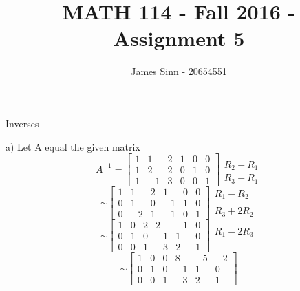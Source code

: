 \documentclass[12pt]{article}
\newcommand{\sqbrl}{\left[}
\newcommand{\sqbrr}{\right]}
\newenvironment{problem}[2][Problem]{\begin{trivlist}
\item[\hskip \labelsep {\bfseries #1}\hskip \labelsep {\bfseries #2.}]}{\end{trivlist}}
\begin{document}
 
 
\title{MATH 114 - Fall 2016 - Assignment 5}
\author{James Sinn - 20654551}
\maketitle

\begin{problem}{1}
	Inverses
\end{problem}
a) Let A equal the given matrix\\
\[A^{-1} = \sqbrl\begin{array}{ccc|ccc}
1 & 1 & 2 & 1 & 0 & 0\\
1 & 2 & 2 & 0 & 1 & 0 \\
1 & -1 & 3 & 0 & 0 & 1
\end{array}\sqbrr\begin{matrix}\\R_2 - R_1\\R_3 - R_1\end{matrix}\]
\[\sim \sqbrl\begin{array}{ccc|ccc}
1 & 1 & 2 & 1 & 0 & 0\\
0 & 1 & 0 & -1 & 1 & 0\\
0 & -2 & 1 & -1 & 0 & 1
\end{array}\sqbrr\begin{matrix}R_1 - R_2\\\\R_3 + 2R_2\end{matrix}\]
\[\sim \sqbrl\begin{array}{ccc|ccc}
1 & 0 & 2 & 2 & -1 & 0\\
0 & 1 & 0 & -1 & 1 & 0\\
0 & 0 & 1 & -3 & 2 & 1
\end{array}\sqbrr\begin{matrix}R_1 - 2R_3\\\\\end{matrix}\]
\[\sim \sqbrl\begin{array}{ccc|ccc}
1 & 0 & 0  & 8 & -5 & -2\\
0 & 1 & 0 & -1 & 1 & 0\\
0 & 0 & 1 & -3 & 2 & 1
\end{array}\sqbrr\]
\end{document}
